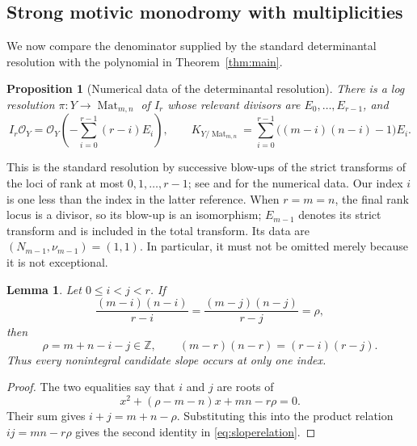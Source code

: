 \documentclass[11pt,a4paper]{article}
\numberwithin{equation}{section}
\newtheorem{proposition}[theorem]{Proposition}
\newtheorem{lemma}[theorem]{Lemma}
\theoremstyle{definition}
\newcommand{\Z}{\mathbb Z}
\DeclareMathOperator{\Mat}{Mat}
\begin{document}
\subsection{Strong motivic monodromy with multiplicities}\label{subsec:strong}
We now compare the denominator supplied by the standard determinantal
resolution with the polynomial in Theorem~\ref{thm:main}.

\begin{proposition}[Numerical data of the determinantal resolution]
\label{prop:detresolution}
There is a log resolution $\pi:Y\to\Mat_{m,n}$ of $I_r$ whose
relevant divisors are $E_0,\ldots,E_{r-1}$, and
\begin{equation}\label{eq:detresolution}
I_r\mathcal O_Y=\mathcal O_Y\left(-\sum_{i=0}^{r-1}(r-i)E_i\right),
\qquad
K_{Y/\Mat_{m,n}}=\sum_{i=0}^{r-1}\big((m-i)(n-i)-1\big)E_i.
\end{equation}
\end{proposition}
This is the standard resolution by successive blow-ups of the strict
transforms of the loci of rank at most $0,1,\ldots,r-1$; see
\cite{Vainsencher} and \cite[Proposition~3.3]{CZ25} for the numerical
data. Our index $i$ is one less than the index in the latter reference.
When $r=m=n$, the final rank locus is a divisor, so its blow-up is
an isomorphism; $E_{m-1}$ denotes its strict transform and is included
in the total transform. Its data are $(N_{m-1},\nu_{m-1})=(1,1)$.
In particular, it must not be omitted merely because it is not
exceptional.

\begin{lemma}\label{lem:coincidentslopes}
Let $0\le i<j<r$. If
\[
\frac{(m-i)(n-i)}{r-i}
=\frac{(m-j)(n-j)}{r-j}=\rho,
\]
then
\begin{equation}\label{eq:sloperelation}
\rho=m+n-i-j\in\Z,
\qquad (m-r)(n-r)=(r-i)(r-j).
\end{equation}
Thus every nonintegral candidate slope occurs at only one index.
\end{lemma}
\begin{proof}
The two equalities say that $i$ and $j$ are roots of
\[
x^2+(\rho-m-n)x+mn-r\rho=0.
\]
Their sum gives $i+j=m+n-\rho$. Substituting this into the
product relation $ij=mn-r\rho$ gives the second identity in
\eqref{eq:sloperelation}.
\end{proof}
\end{document}
